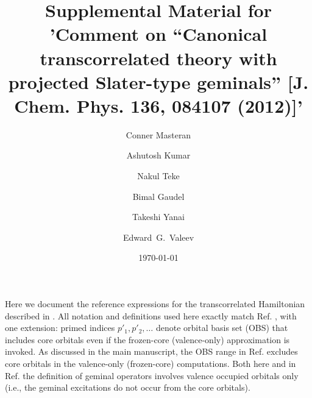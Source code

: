 \documentclass[aip,onecolumn,preprint]{revtex4-1}
\begin{document}

\title{Supplemental Material for 'Comment on ``Canonical transcorrelated theory with projected Slater-type geminals''  [J. Chem. Phys. 136, 084107 (2012)]'} %

\author{Conner Masteran}

\author{Ashutosh Kumar}

\author{Nakul Teke}

\author{Bimal Gaudel}

\author{Takeshi Yanai}

\author{Edward~G.~Valeev}

\date{\today}


\maketitle %

Here we document the reference expressions for the transcorrelated Hamiltonian described in .
All notation and definitions used here exactly match Ref. , with one extension: primed indices $p'_1, p'_2, \dots$ denote orbital basis set (OBS) that includes core orbitals even if the frozen-core (valence-only) approximation is invoked. As discussed in the main manuscript, the OBS range in Ref.  excludes core orbitals in the valence-only (frozen-core) computations. Both here and in Ref.  the definition of geminal operators involves valence occupied orbitals only (i.e., the geminal excitations do not occur from the core orbitals).
\end{document}
